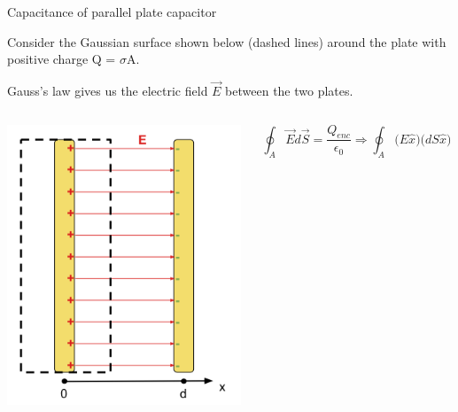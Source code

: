 %
%
%

\begin{frame}{Capacitance of parallel plate capacitor}

Consider the Gaussian surface shown below (dashed lines) around the plate with positive charge Q = $\sigma$A.\\
\vspace{0.1cm}

Gauss's law gives us the electric field $\vec{E}$ between the two plates.\\
\vspace{0.2cm}

\begin{columns}
  \begin{column}{0.30\textwidth}
   \begin{center}
     \includegraphics[width=0.99\textwidth]{./images/schematics/parallel_plate_capacitor_gaussian_surface.png}\\
   \end{center}
  \end{column}
  \begin{column}{0.70\textwidth}
     \begin{equation*}
       \oint_{A} \vec{E} d\vec{S} = \frac{Q_{enc}}{\epsilon_0} \Rightarrow
       \oint_{A} \big( E \hat{x} \big) \big( dS \hat{x} \big) = \frac{\sigma A}{\epsilon_0} \Rightarrow
     \end{equation*}


\end{column}
\end{columns}
\end{frame}
